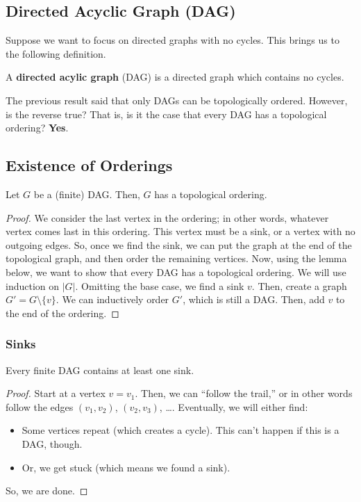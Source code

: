 \documentclass[letterpaper]{article}
\begin{document}
\subsection{Directed Acyclic Graph (DAG)}
Suppose we want to focus on directed graphs with no cycles. This brings us to the following definition.
\begin{definition}{}{}
    A \textbf{directed acylic graph} (DAG) is a directed graph which contains no cycles. 
\end{definition}

The previous result said that only DAGs can be topologically ordered. However, is the reverse true? That is, is it the case that every DAG has a topological ordering? \textbf{Yes}. 

\subsection{Existence of Orderings}
\begin{theorem}{}{}
    Let $G$ be a (finite) DAG. Then, $G$ has a topological ordering.
\end{theorem}

\begin{mdframed}[]
    \begin{proof}
        We consider the last vertex in the ordering; in other words, whatever vertex comes last in this ordering. This vertex must be a sink, or a vertex with no outgoing edges. So, once we find the sink, we can put the graph at the end of the topological graph, and then order the remaining vertices. Now, using the lemma below, we want to show that every DAG has a topological ordering. We will use induction on $|G|$. Omitting the base case, we find a sink $v$. Then, create a graph $G' = G \setminus \{v\}$. We can inductively order $G'$, which is still a DAG. Then, add $v$ to the end of the ordering. 
    \end{proof}
\end{mdframed}

\subsubsection{Sinks}
\begin{lemma}{}{}
    Every finite DAG contains at least one sink. 
\end{lemma}

\begin{mdframed}[]
    \begin{proof}
        Start at a vertex $v = v_1$. Then, we can ``follow the trail,'' or in other words follow the edges $(v_1, v_2)$, $(v_2, v_3)$, \dots. Eventually, we will either find: 
        \begin{itemize}
            \item Some vertices repeat (which creates a cycle). This can't happen if this is a DAG, though. 
            \item Or, we get stuck (which means we found a sink).
        \end{itemize}
        So, we are done. 
    \end{proof}
\end{mdframed}
\end{document}
